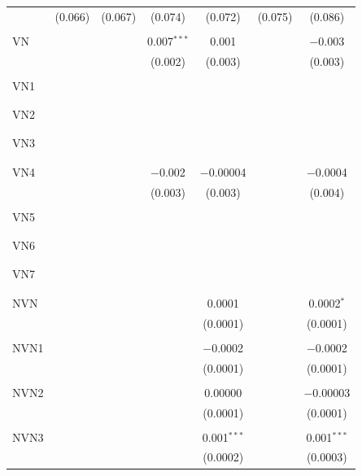 \begin{table}[!htbp]
\begin{tabular}{@{\extracolsep{5pt}}lcccccc}
  & (0.066) & (0.067) & (0.074) & (0.072) & (0.075) & (0.086) \\ 
  & & & & & & \\ 
 VN &  &  & 0.007$^{***}$ & 0.001 &  & $-$0.003 \\ 
  &  &  & (0.002) & (0.003) &  & (0.003) \\ 
  & & & & & & \\ 
 VN1 &  &  &  &  &  &  \\ 
  &  &  &  &  &  &  \\ 
  & & & & & & \\ 
 VN2 &  &  &  &  &  &  \\ 
  &  &  &  &  &  &  \\ 
  & & & & & & \\ 
 VN3 &  &  &  &  &  &  \\ 
  &  &  &  &  &  &  \\ 
  & & & & & & \\ 
 VN4 &  &  & $-$0.002 & $-$0.00004 &  & $-$0.0004 \\ 
  &  &  & (0.003) & (0.003) &  & (0.004) \\ 
  & & & & & & \\ 
 VN5 &  &  &  &  &  &  \\ 
  &  &  &  &  &  &  \\ 
  & & & & & & \\ 
 VN6 &  &  &  &  &  &  \\ 
  &  &  &  &  &  &  \\ 
  & & & & & & \\ 
 VN7 &  &  &  &  &  &  \\ 
  &  &  &  &  &  &  \\ 
  & & & & & & \\ 
 NVN &  &  &  & 0.0001 &  & 0.0002$^{*}$ \\ 
  &  &  &  & (0.0001) &  & (0.0001) \\ 
  & & & & & & \\ 
 NVN1 &  &  &  & $-$0.0002 &  & $-$0.0002 \\ 
  &  &  &  & (0.0001) &  & (0.0001) \\ 
  & & & & & & \\ 
 NVN2 &  &  &  & 0.00000 &  & $-$0.00003 \\ 
  &  &  &  & (0.0001) &  & (0.0001) \\ 
  & & & & & & \\ 
 NVN3 &  &  &  & 0.001$^{***}$ &  & 0.001$^{***}$ \\ 
  &  &  &  & (0.0002) &  & (0.0003) \\ 

\end{tabular}
\end{table}
